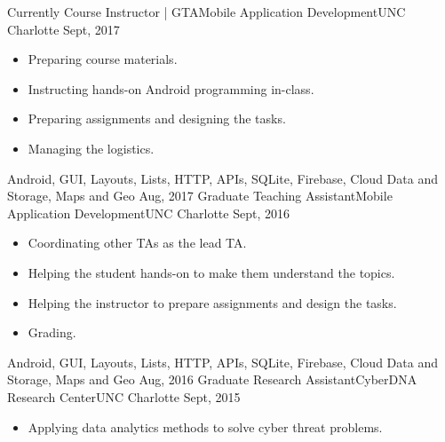 %
%
%
\begin{experiences}
  \experience
    {Currently}   {Course Instructor | GTA}{Mobile Application Development}{UNC Charlotte}
    {Sept, 2017} {
                      \begin{itemize}
                        \item Preparing course materials.
                        \item Instructing hands-on Android programming in-class.
                        \item Preparing assignments and designing the tasks.
                        \item Managing the logistics.                                                                   
                      \end{itemize}
                    }
                    {Android, GUI, Layouts, Lists, HTTP, APIs, SQLite, Firebase, Cloud Data and Storage, Maps and Geo}
  \emptySeparator
  \experience
    {Aug, 2017}   {Graduate Teaching Assistant}{Mobile Application Development}{UNC Charlotte}
    {Sept, 2016} {
                      \begin{itemize}
                        \item Coordinating other TAs as the lead TA.
                        \item Helping the student hands-on to make them understand the topics.
                        \item Helping the instructor to prepare assignments and design the tasks.
                        \item Grading.                                                                   
                      \end{itemize}
                    }
                    {Android, GUI, Layouts, Lists, HTTP, APIs, SQLite, Firebase, Cloud Data and Storage, Maps and Geo}
  \emptySeparator    
  \experience
    {Aug, 2016}   {Graduate Research Assistant}{CyberDNA Research Center}{UNC Charlotte}
    {Sept, 2015} {
                      \begin{itemize}
                        \item Applying data analytics methods to solve cyber threat problems.

\end{itemize}}
\end{experiences}
